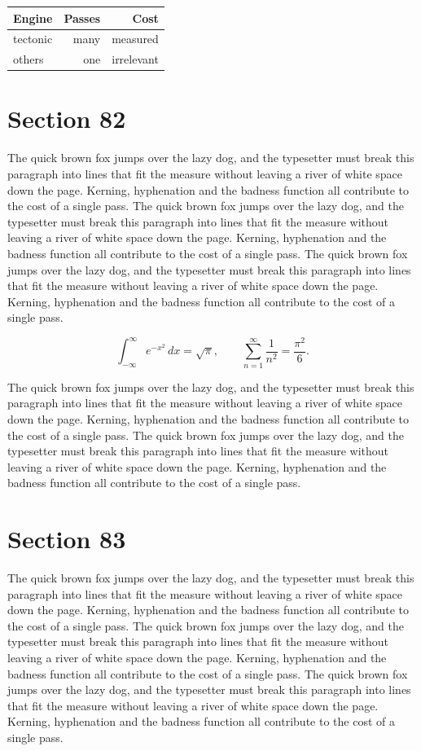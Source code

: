 \documentclass{article}
\begin{document}
\begin{center}
\begin{tabular}{lrr}
\toprule
Engine & Passes & Cost \\
\midrule
tectonic & many & measured \\
others & one & irrelevant \\
\bottomrule
\end{tabular}
\end{center}

\section{Section 82}
The quick brown fox jumps over the lazy dog, and the typesetter must break this paragraph into lines that fit the measure without leaving a river of white space down the page. Kerning, hyphenation and the badness function all contribute to the cost of a single pass. The quick brown fox jumps over the lazy dog, and the typesetter must break this paragraph into lines that fit the measure without leaving a river of white space down the page. Kerning, hyphenation and the badness function all contribute to the cost of a single pass. The quick brown fox jumps over the lazy dog, and the typesetter must break this paragraph into lines that fit the measure without leaving a river of white space down the page. Kerning, hyphenation and the badness function all contribute to the cost of a single pass. 

\begin{equation}
\int_{-\infty}^{\infty} e^{-x^{2}}\,dx = \sqrt{\pi}, \qquad
\sum_{n=1}^{\infty} \frac{1}{n^{2}} = \frac{\pi^{2}}{6}.
\end{equation}

The quick brown fox jumps over the lazy dog, and the typesetter must break this paragraph into lines that fit the measure without leaving a river of white space down the page. Kerning, hyphenation and the badness function all contribute to the cost of a single pass. The quick brown fox jumps over the lazy dog, and the typesetter must break this paragraph into lines that fit the measure without leaving a river of white space down the page. Kerning, hyphenation and the badness function all contribute to the cost of a single pass. 
\section{Section 83}
The quick brown fox jumps over the lazy dog, and the typesetter must break this paragraph into lines that fit the measure without leaving a river of white space down the page. Kerning, hyphenation and the badness function all contribute to the cost of a single pass. The quick brown fox jumps over the lazy dog, and the typesetter must break this paragraph into lines that fit the measure without leaving a river of white space down the page. Kerning, hyphenation and the badness function all contribute to the cost of a single pass. The quick brown fox jumps over the lazy dog, and the typesetter must break this paragraph into lines that fit the measure without leaving a river of white space down the page. Kerning, hyphenation and the badness function all contribute to the cost of a single pass. 
\end{document}
